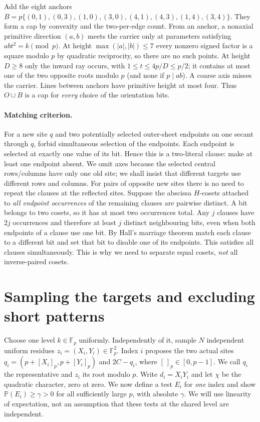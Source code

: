 \documentclass[11pt]{article}
\newcommand{\F}{\mathbb F_p}\newcommand{\G}{\mathcal G}\newcommand{\D}{\mathcal D}\newcommand{\R}{\mathcal R}\newcommand{\Z}{\mathbb Z}\newcommand{\htf}{F_{\mathrm{ht}}}\newcommand{\norm}[1]{\lVert#1\rVert_\infty}\newcommand{\Prob}{\mathbb P}\newcommand{\ch}{\chi}\newcommand{\TT}{\mathcal T}
\begin{document}
Add the eight anchors $B=p\{(0,1),(0,3),(1,0),(3,0),(4,1),(4,3),(1,4),(3,4)\}$. They form a cap by convexity and the two-per-edge count. From an anchor, a nonaxial primitive direction $(a,b)$ meets the carrier only at parameters satisfying $ab t^2=k\pmod p$. At height $\max(|a|,|b|)\le7$ every nonzero signed factor is a square modulo $p$ by quadratic reciprocity, so there are no such points. At height $D\ge8$ only the inward ray occurs, with $1\le t\le4p/D\le p/2$; it contains at most one of the two opposite roots modulo $p$ (and none if $p\mid ab$). A coarse axis misses the carrier. Lines between anchors have primitive height at most four. Thus $O\cup B$ is a cap for \emph{every} choice of the orientation bits.

\paragraph{Matching criterion.} For a new site $q$ and two potentially selected outer-sheet endpoints on one secant through $q$, forbid simultaneous selection of the endpoints. Each endpoint is selected at exactly one value of its bit. Hence this is a two-literal clause: make at least one endpoint absent. We omit axes because the selected central rows/columns have only one old site; we shall insist that different targets use different rows and columns. For pairs of opposite new sites there is no need to repeat the clauses at the reflected sites. Suppose the abscissa $H$-cosets attached to \emph{all endpoint occurrences} of the remaining clauses are pairwise distinct. A bit belongs to two cosets, so it has at most two occurrences total. Any $j$ clauses have $2j$ occurrences and therefore at least $j$ distinct neighbouring bits, even when both endpoints of a clause use one bit. By Hall's marriage theorem match each clause to a different bit and set that bit to disable one of its endpoints. This satisfies all clauses simultaneously. This is why we need to separate equal cosets, \emph{not} all inverse-paired cosets.

\section{Sampling the targets and excluding short patterns}
Choose one level $k\in\F$ uniformly. Independently of it, sample $N$ independent uniform residues $z_i=(X_i,Y_i)\in\F^2$. Index $i$ proposes the two actual sites $q_i=(p+[X_i]_p,p+[Y_i]_p)$ and $2C-q_i$, where $[\ ]_p\in[0,p-1]$. We call $q_i$ the representative and $z_i$ its root modulo $p$. Write $d_i=X_iY_i$ and let $\ch$ be the quadratic character, zero at zero. We now define a test $E_i$ for \emph{one} index and show $\Prob(E_i)\ge\gamma>0$ for all sufficiently large $p$, with absolute $\gamma$. We will use linearity of expectation, not an assumption that these tests at the shared level are independent.
\end{document}
